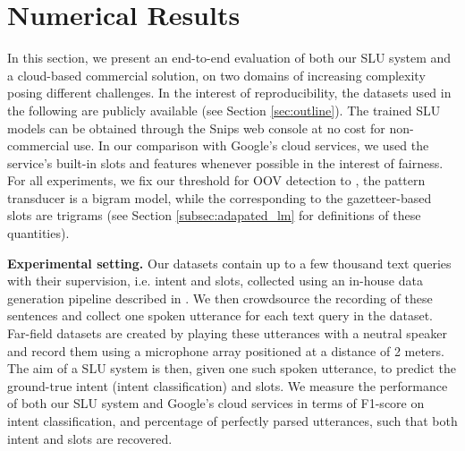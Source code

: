 \documentclass{article}
\begin{document}
  
\section{Numerical Results}
\label{sec:experiments}
  
  In this section, we present an end-to-end evaluation of both our SLU system and a cloud-based commercial solution, on two domains of increasing complexity posing different challenges.
  In the interest of reproducibility, the datasets used in the following are publicly available (see Section \ref{sec:outline}). 
  The trained SLU models can be obtained through the Snips web console at no cost for non-commercial use. 
  In our comparison with Google's cloud services, we used the service's built-in slots and features whenever possible in the interest of fairness. 
  For all experiments, we fix our threshold for OOV detection to , the pattern transducer  is a bigram model, while the  corresponding to the gazetteer-based slots are trigrams (see Section \ref{subsec:adapated_lm} for definitions of these quantities).

\textbf{Experimental setting.} Our datasets contain up to a few thousand text queries with their supervision, i.e. intent and slots, collected using an in-house data generation pipeline described in \cite{coucke2018snips}. 
  We then crowdsource the recording of these sentences and collect one spoken utterance for each text query in the dataset. 
  Far-field datasets are created by playing these utterances with a neutral speaker and record them using a microphone array positioned at a distance of 2 meters. 
  The aim of a SLU system is then, given one such spoken utterance, to predict the ground-true intent (intent classification) and slots. We measure the performance of both our SLU system and Google's cloud services in terms of F1-score on intent classification, and percentage of perfectly parsed utterances, such that both intent and slots are recovered.
  
\end{document}
